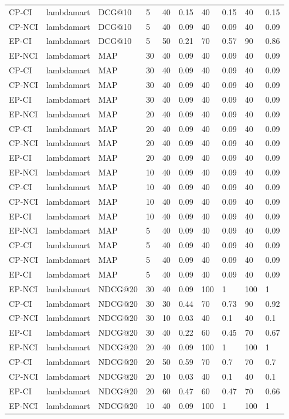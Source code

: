 \begin{landscape}
\begin{longtable}{|*{10}{l|}}
CP-CI&lambdamart&DCG@10&5&40&0.15&40&0.15&40&0.15\\
CP-NCI&lambdamart&DCG@10&5&40&0.09&40&0.09&40&0.09\\
EP-CI&lambdamart&DCG@10&5&50&0.21&70&0.57&90&0.86\\
\hline
EP-NCI&lambdamart&MAP&30&40&0.09&40&0.09&40&0.09\\
CP-CI&lambdamart&MAP&30&40&0.09&40&0.09&40&0.09\\
CP-NCI&lambdamart&MAP&30&40&0.09&40&0.09&40&0.09\\
EP-CI&lambdamart&MAP&30&40&0.09&40&0.09&40&0.09\\
\hline
EP-NCI&lambdamart&MAP&20&40&0.09&40&0.09&40&0.09\\
CP-CI&lambdamart&MAP&20&40&0.09&40&0.09&40&0.09\\
CP-NCI&lambdamart&MAP&20&40&0.09&40&0.09&40&0.09\\
EP-CI&lambdamart&MAP&20&40&0.09&40&0.09&40&0.09\\
\hline
EP-NCI&lambdamart&MAP&10&40&0.09&40&0.09&40&0.09\\
CP-CI&lambdamart&MAP&10&40&0.09&40&0.09&40&0.09\\
CP-NCI&lambdamart&MAP&10&40&0.09&40&0.09&40&0.09\\
EP-CI&lambdamart&MAP&10&40&0.09&40&0.09&40&0.09\\
\hline
EP-NCI&lambdamart&MAP&5&40&0.09&40&0.09&40&0.09\\
CP-CI&lambdamart&MAP&5&40&0.09&40&0.09&40&0.09\\
CP-NCI&lambdamart&MAP&5&40&0.09&40&0.09&40&0.09\\
EP-CI&lambdamart&MAP&5&40&0.09&40&0.09&40&0.09\\
\hline
EP-NCI&lambdamart&NDCG@20&30&40&0.09&100&1&100&1\\
CP-CI&lambdamart&NDCG@20&30&30&0.44&70&0.73&90&0.92\\
CP-NCI&lambdamart&NDCG@20&30&10&0.03&40&0.1&40&0.1\\
EP-CI&lambdamart&NDCG@20&30&40&0.22&60&0.45&70&0.67\\
\hline
EP-NCI&lambdamart&NDCG@20&20&40&0.09&100&1&100&1\\
CP-CI&lambdamart&NDCG@20&20&50&0.59&70&0.7&70&0.7\\
CP-NCI&lambdamart&NDCG@20&20&10&0.03&40&0.1&40&0.1\\
EP-CI&lambdamart&NDCG@20&20&60&0.47&60&0.47&70&0.66\\
\hline
EP-NCI&lambdamart&NDCG@20&10&40&0.09&100&1&100&1\\

\end{longtable}
\end{landscape}
